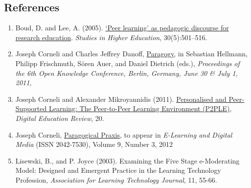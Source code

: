\subsection{References}

\begin{enumerate}
\item
  Boud, D. and Lee, A. (2005).
  \href{http://manainkblog.typepad.com/faultlines/files/BoudLee2005.pdf}{`Peer
  learning' as pedagogic discourse for research education}.
  \emph{Studies in Higher Education}, 30(5):501--516.
\item
  Joseph Corneli and Charles Jeffrey Danoff,
  \href{http://ceur-ws.org/Vol-739/paper\_5.pdf}{Paragogy}, in Sebastian
  Hellmann, Philipp Frischmuth, Sören Auer, and Daniel Dietrich (eds.),
  \emph{Proceedings of the 6th Open Knowledge Conference, Berlin,
  Germany, June 30 \& July 1, 2011},
\item
  Joseph Corneli and Alexander Mikroyannidis (2011).
  \href{http://greav.ub.edu/der/index.php/der/article/view/188/330}{Personalised
  and Peer-Supported Learning: The Peer-to-Peer Learning Environment
  (P2PLE)}, \emph{Digital Education Review}, 20.
\item
  Joseph Corneli,
  \href{http://paragogy.net/ParagogicalPraxisPaper}{Paragogical Praxis},
  to appear in \emph{E-Learning and Digital Media} (ISSN 2042-7530),
  Volume 9, Number 3, 2012
\item
  Lisewski, B., and P. Joyce (2003). Examining the Five Stage
  e-Moderating Model: Designed and Emergent Practice in the Learning
  Technology Profession, \emph{Association for Learning Technology
  Journal}, 11, 55-66.
\end{enumerate}
